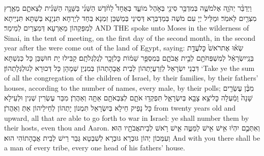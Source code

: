 {וַיְדַבֵּ֨ר יְהֹוָ֧ה אֶל\maqqaf מֹשֶׁ֛ה בְּמִדְבַּ֥ר סִינַ֖י בְּאֹ֣הֶל מוֹעֵ֑ד בְּאֶחָד֩ לַחֹ֨דֶשׁ הַשֵּׁנִ֜י בַּשָּׁנָ֣ה הַשֵּׁנִ֗ית לְצֵאתָ֛ם מֵאֶ֥רֶץ מִצְרַ֖יִם לֵאמֹֽר׃}
{וּמַלֵּיל יְיָ עִם מֹשֶׁה בְּמַדְבְּרָא דְּסִינַי בְּמַשְׁכַּן זִמְנָא בְּחַד לְיַרְחָא תִּנְיָנָא בְּשַׁתָּא תִּנְיֵיתָא לְמִפַּקְהוֹן מֵאַרְעָא דְּמִצְרַיִם לְמֵימַר׃}
{AND THE \lord\space spoke unto Moses in the wilderness of Sinai, in the tent of meeting, on the first day of the second month, in the second year after the were come out of the land of Egypt, saying:}{}
{שְׂא֗וּ אֶת\maqqaf רֹאשׁ֙ כׇּל\maqqaf עֲדַ֣ת בְּנֵֽי\maqqaf יִשְׂרָאֵ֔ל לְמִשְׁפְּחֹתָ֖ם לְבֵ֣ית אֲבֹתָ֑ם בְּמִסְפַּ֣ר שֵׁמ֔וֹת כׇּל\maqqaf זָכָ֖ר לְגֻלְגְּלֹתָֽם׃}
{קַבִּילוּ יָת חוּשְׁבַּן כָּל כְּנִשְׁתָּא דִּבְנֵי יִשְׂרָאֵל לְזַרְעֲיָתְהוֹן לְבֵית אֲבָהָתְהוֹן בְּמִנְיַן שְׁמָהָן כָּל דְּכוּרָא לְגוּלְגְּלָתְהוֹן׃}
{‘Take ye the sum of all the congregation of the children of Israel, by their families, by their fathers’ houses, according to the number of names, every male, by their polls;}{}
{מִבֶּ֨ן עֶשְׂרִ֤ים שָׁנָה֙ וָמַ֔עְלָה כׇּל\maqqaf יֹצֵ֥א צָבָ֖א בְּיִשְׂרָאֵ֑ל תִּפְקְד֥וּ אֹתָ֛ם לְצִבְאֹתָ֖ם אַתָּ֥ה וְאַהֲרֹֽן׃}
{מִבַּר עֶשְׂרִין שְׁנִין וּלְעֵילָא כָּל נָפֵיק חֵילָא בְּיִשְׂרָאֵל תִּמְנוֹן יָתְהוֹן לְחֵילֵיהוֹן אַתְּ וְאַהֲרֹן׃}
{from twenty years old and upward, all that are able to go forth to war in Israel: ye shall number them by their hosts, even thou and Aaron.}{}
{וְאִתְּכֶ֣ם יִהְי֔וּ אִ֥ישׁ אִ֖ישׁ לַמַּטֶּ֑ה אִ֛ישׁ רֹ֥אשׁ לְבֵית\maqqaf אֲבֹתָ֖יו הֽוּא׃}
{וְעִמְּכוֹן יְהוֹן גּוּבְרָא גּוּבְרָא לְשִׁבְטָא גְּבַר רֵישׁ לְבֵית אֲבָהָתוֹהִי הוּא׃}
{And with you there shall be a man of every tribe, every one head of his fathers’ house.}{}
